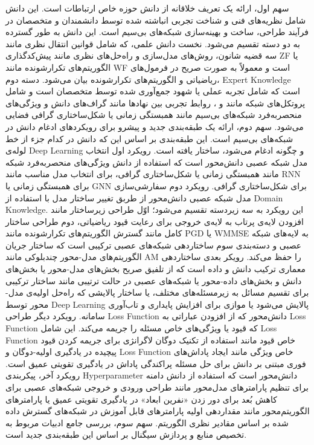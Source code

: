 سهم اول، ارائه یک تعریف خلاقانه از دانش حوزه خاص ارتباطات است. این دانش شامل نظریه‌های فنی و شناخت تجربی انباشته شده توسط دانشمندان و متخصصان در فرآیند طراحی، ساخت و بهینه‌سازی شبکه‌های بی‌سیم است. این دانش به طور گسترده به دو دسته تقسیم می‌شود. نخست دانش علمی، که شامل قوانین انتقال نظری مانند سه قضیه شانون، ‌روش‌های مدل‌سازی و راه‌حل‌های نظری مانند پیش‌کدگذاری 
\gls{ZF}
یا الگوریتم‌های تکرارشونده مانند 
\gls{WF}
 است و معمولاً به صورت صریح در فرمول‌های ریاضیاتی و الگوریتم‌های تکرارشونده بیان می‌شود. دسته دوم، 
\gls{Expert Knowledge}
  است که شامل تجربه عملی یا شهود جمع‌آوری شده توسط متخصصان است و شامل پروتکل‌های شبکه مانند 
   و 
،
    روابط تجربی بین نهادها مانند گراف‌های دانش و ویژگی‌های منحصربه‌فرد شبکه‌های بی‌سیم مانند همبستگی زمانی یا شکل‌ساختاری گرافی فضایی می‌شود.
سهم دوم، ارائه یک طبقه‌بندی جدید و پیشرو برای رویکردهای ادغام دانش در شبکه‌های بی‌سیم است. این طبقه‌بندی بر اساس این که دانش در کدام جزء از خط لوله‌ی 
\gls{Deep Learning}
 و چگونه ادغام می‌شود، ساختار یافته است. رویکرد اول انتخاب مدل شبکه عصبی دانش‌محور است که استفاده از دانش ویژگی‌های منحصربه‌فرد شبکه مانند همبستگی زمانی یا شکل‌ساختاری گرافی، برای انتخاب مدل مناسب مانند 
\gls{RNN}
  برای همبستگی زمانی یا 
\gls{GNN}
   برای شکل‌ساختاری گرافی.
رویکرد دوم سفارشی‌سازی مدل شبکه عصبی دانش‌محور از طربق تغییر ساختار مدل با استفاده از 
\gls{Domain Knowledge}.
 این رویکرد به سه زیردسته تقسیم می‌شود؛ اوّل طراحی زیرساختار مانند افزودن لایه‌ی پرتاب به لایه‌ی خروجی برای رعایت قیود ریاضیاتی، دوم طراحی ساختار کامل مانند گسترش الگوریتم‌های تکرارشونده مانند 
\gls{PGD}
  یا 
\gls{WMMSE}
   به لایه‌های شبکه عصبی و دسته‌بندی سوم ساختاردهی شبکه‌های عصبی ترکیبی است که ساختار جریان الگوریتم‌های مدل-محور چندبلوکی مانند 
\gls{AM}
    را حفظ می‌کند.
رویکر بعدی ساختاردهی معماری ترکیب دانش و داده است که از تلفیق صریح بخش‌های مدل-محور یا بخش‌های دانش و بخش‌های داده-محور یا شبکه‌های عصبی در حالت ترتیبی مانند ساختار ترکیبی برای تقسیم مسائل به زیرمسئله‌های مختلف، یا ساختار پالایشی که راه‌حل اولیه‌ی مدل-محور توسط 
\gls{Deep Learning}
 پالایش می‌شود یا موازی برای افزایش پایداری و تاب‌آوری سامانه.
رویکرد دیگر طراحی 
\gls{Loss Function}
دانش‌محور که از افزودن عباراتی به 
\gls{Loss Function}
 که قیود یا ویژگی‌های خاص مسئله را جریمه می‌کند. این شامل 
\gls{Loss Function}
 خاص قیود مانند استفاده از تکنیک دوگان لاگرانژی برای جریمه کردن قیود پیچیده در یادگیری اولیه-دوگان و 
\gls{Loss Function}
 خاص ویژگی مانند ایجاد پاداش‌های فوری مبتنی بر دانش برای حل مسئله پراکندگی پاداش در  یادگیری تقویتی عمیق است.
رویکرد آخر، پیکربندی 
\gls{Hyperparameter}
 دانش‌محور است که استفاده از دانش دامنه برای تنظیم پارامترهای مدل‌محور مانند طراحی ورودی و خروجی شبکه‌های عصبی برای کاهش بُعد برای دور زدن «نفرین ابعاد» در یادگیری تقویتی عمیق یا پارامترهای الگوریتم‌محور مانند مقداردهی اولیه پارامترهای قابل آموزش در شبکه‌های گسترش داده شده بر اساس مقادیر نظری الگوریتم.
سهم سوم، بررسی جامع ادبیات مربوط به تخصیص منابع و پردازش سیگنال بر اساس این طبقه‌بندی جدید است.

